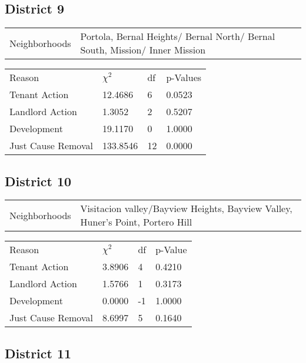 \documentclass[]{article}
\begin{document}
\subsection{District 9}

\begin {table}[h]
\centering
\begin{tabular}{l | l}
	Neighborhoods &  Portola, Bernal Heights/ Bernal North/ Bernal South, Mission/ Inner Mission
\end{tabular}
\begin{tabular}{l | l | l | l}
	
	Reason				 &  $\chi ^{2}$ & df & p-Values\\
	Tenant Action 		   & 12.4686   &  6 & 0.0523 \\
	Landlord Action	       &  1.3052  & 2  & 0.5207 \\
	Development			   &  19.1170  & 0  & 1.0000 \\
	Just Cause Removal	   &  133.8546  & 12  & 0.0000 \\
\end{tabular} \newline
\end{table}
\FloatBarrier

\subsection{District 10}

\begin {table}[h]
\centering
\begin{tabular}{l | l}
	Neighborhoods & Visitacion valley/Bayview Heights, Bayview Valley, Huner's Point, Portero Hill
\end{tabular}
\begin{tabular}{l | l | l | l}
	
	Reason				 &  $\chi ^{2}$ & df & p-Value \\
	Tenant Action 		   &  3.8906  &  4  & 0.4210 \\
	Landlord Action	       &  1.5766  &  1  & 0.3173 \\
	Development			   &  0.0000  &  -1  & 1.0000 \\
	Just Cause Removal	   &  8.6997  &  5  & 0.1640 \\
\end{tabular} \newline
\end{table}
\FloatBarrier



\subsection{District 11}
\end{document}
